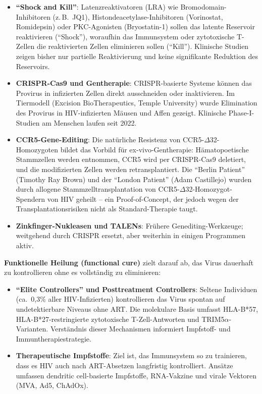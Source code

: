 ﻿\documentclass[a4paper,12pt]{article}
\theoremstyle{definition}
\begin{document}
\begin{itemize}
\item \textbf{``Shock and Kill''}: Latenzreaktivatoren (LRA) wie Bromodomain-Inhibitoren
      (z.\,B.\ JQ1), Histondeacetylase-Inhibitoren (Vorinostat, Romidepsin) oder
      PKC-Agonisten (Bryostatin-1) sollen das latente Reservoir reaktivieren
      (``Shock''), woraufhin das Immunsystem oder zytotoxische T-Zellen die reaktivierten
      Zellen eliminieren sollen (``Kill''). Klinische Studien zeigen bisher nur partielle
      Reaktivierung und keine signifikante Reduktion des Reservoirs.

\item \textbf{CRISPR-Cas9 und Gentherapie}: CRISPR-basierte Systeme k\"onnen das Provirus
      in infizierten Zellen direkt ausschneiden oder inaktivieren. Im Tiermodell
      (Excision BioTherapeutics, Temple University) wurde Elimination des Provirus in
      HIV-infizierten Mäusen und Affen gezeigt. Klinische Phase-I-Studien am Menschen
      laufen seit 2022.

\item \textbf{CCR5-Gene-Editing}: Die nat\"urliche Resistenz von CCR5-$\Delta$32-Homozygoten
      bildet das Vorbild f\"ur ex-vivo-Gentherapie: H\"amatopoetische Stammzellen werden
      entnommen, CCR5 wird per CRISPR-Cas9 deletiert, und die modifizierten Zellen
      werden retransplantiert. Die ``Berlin Patient'' (Timothy Ray Brown) und der
      ``London Patient'' (Adam Castillejo) wurden durch allogene Stammzelltransplantation
      von CCR5-$\Delta$32-Homozygot-Spendern von HIV geheilt -- ein Proof-of-Concept,
      der jedoch wegen der Transplantationsrisiken nicht als Standard-Therapie taugt.

\item \textbf{Zinkfinger-Nukleasen und TALENs}: Fr\"uhere Genediting-Werkzeuge;
      weitgehend durch CRISPR ersetzt, aber weiterhin in einigen Programmen aktiv.
\end{itemize}

\textbf{Funktionelle Heilung (functional cure)} zielt darauf ab, das Virus dauerhaft
zu kontrollieren ohne es vollst\"andig zu eliminieren:

\begin{itemize}
\item \textbf{``Elite Controllers'' und Posttreatment Controllers}: Seltene Individuen
      (ca.\ 0{,}3\% aller HIV-Infizierten) kontrollieren das Virus spontan auf
      undetektierbare Niveaus ohne ART. Die molekulare Basis umfasst HLA-B*57,
      HLA-B*27-restringierte zytotoxische T-Zell-Antworten und TRIM5$\alpha$-Varianten.
      Verst\"andnis dieser Mechanismen informiert Impfstoff- und Immuntherapiestrategie.

\item \textbf{Therapeutische Impfstoffe}: Ziel ist, das Immunsystem so zu trainieren,
      dass es HIV auch nach ART-Absetzen langfristig kontrolliert.
      Ans\"atze umfassen dendritic cell-basierte Impfstoffe, RNA-Vakzine und
      virale Vektoren (MVA, Ad5, ChAdOx).
\end{itemize}
\end{document}
